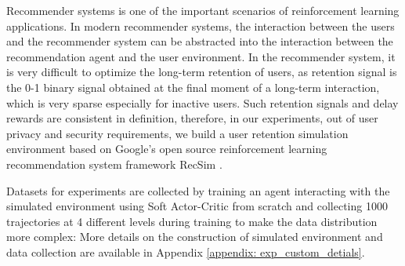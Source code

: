 Recommender systems is one of the important scenarios of reinforcement learning applications. In modern recommender systems, the interaction between the users and the recommender system can be abstracted into the interaction between the recommendation agent and the user environment. In the recommender system, it is very difficult to optimize the long-term retention of users,  as retention signal is the 0-1 binary signal obtained at the final moment of a long-term interaction, which is very sparse especially for inactive users. Such retention signals and delay rewards are consistent in definition, therefore, in our experiments, out of user privacy and security requirements, we build a user retention simulation environment based on Google’s open source reinforcement learning recommendation system framework RecSim \cite{ieRecSimConfigurableSimulation2019}. 

Datasets for experiments are collected by training an agent interacting with the simulated environment 
using Soft Actor-Critic \cite{haarnoja2018soft} from scratch and collecting 1000 trajectories at 
4 different levels during training to make the data distribution more complex: 
More details on the construction of simulated environment and data collection are available in Appendix \ref{appendix: exp_custom_detials}.


